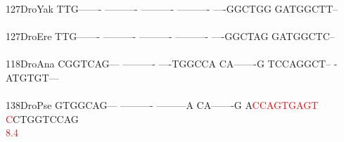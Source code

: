 \documentclass[11pt,twoside,reqno,a4paper]{article}
\begin{document}
{127\hspace*{1\charwidth}DroYak	TTG-------	----------	----------	----------	----GGCTGG	GATGGCTT--	\\
\hspace*{4\charwidth}\hspace*{7\charwidth}\hspace*{1\charwidth}\hspace*{1\charwidth}\hspace*{1\charwidth}\hspace*{1\charwidth}\hspace*{1\charwidth}\hspace*{1\charwidth}\\
127\hspace*{1\charwidth}DroEre	TTG-------	----------	----------	----------	----GGCTAG	GATGGCTC--	\\
\hspace*{4\charwidth}\hspace*{7\charwidth}\hspace*{1\charwidth}\hspace*{1\charwidth}\hspace*{1\charwidth}\hspace*{1\charwidth}\hspace*{1\charwidth}\hspace*{1\charwidth}\\
118\hspace*{1\charwidth}DroAna	CGGTCAG---	----------	----TGGCCA	CA-------G	TCCAGGCT--	-ATGTGT---	\\
\hspace*{4\charwidth}\hspace*{7\charwidth}\hspace*{1\charwidth}\hspace*{1\charwidth}\hspace*{1\charwidth}\hspace*{1\charwidth}\hspace*{1\charwidth}\hspace*{1\charwidth}\\
138\hspace*{1\charwidth}DroPse	GTGGCAG---	----------	---------A	CA-------G	A\textcolor{red}{C}\textcolor{red}{C}\textcolor{red}{A}\textcolor{red}{G}\textcolor{red}{T}\textcolor{red}{G}\textcolor{red}{A}\textcolor{red}{G}\textcolor{red}{T}	\textcolor{red}{C}CTGGTCCAG	\\
\hspace*{4\charwidth}\hspace*{7\charwidth}\hspace*{1\charwidth}\hspace*{1\charwidth}\hspace*{1\charwidth}\hspace*{1\charwidth}\hspace*{41\charwidth}\textcolor{red}{8.4}\hspace*{1\charwidth}\hspace*{1\charwidth}\\
}
\end{document}
